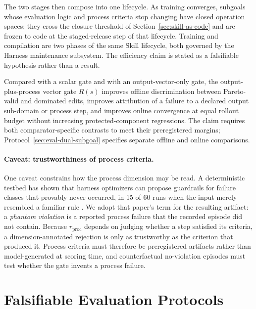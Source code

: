 The two stages then compose into one lifecycle. As training converges, subgoals whose evaluation logic and process criteria stop changing have closed operation spaces; they cross the closure threshold of Section~\ref{sec:skill-as-code} and are frozen to code at the staged-release step of that lifecycle. Training and compilation are two phases of the same Skill lifecycle, both governed by the Harness maintenance subsystem. The efficiency claim is stated as a falsifiable hypothesis rather than a result.

\begin{proposition}
\label{prop:p15}
Compared with a scalar gate and with an output-vector-only gate, the output-plus-process vector gate $R(s)$ improves offline discrimination between Pareto-valid and dominated edits, improves attribution of a failure to a declared output sub-domain or process step, and improves online convergence at equal rollout budget without increasing protected-component regressions. The claim requires both comparator-specific contrasts to meet their preregistered margins; Protocol~\ref{sec:eval-dual-subgoal} specifies separate offline and online comparisons.
\end{proposition}

\paragraph{Caveat: trustworthiness of process criteria.}
One caveat constrains how the process dimension may be read. A deterministic testbed has shown that harness optimizers can propose guardrails for failure classes that provably never occurred, in 15 of 60 runs when the input merely resembled a familiar rule \cite{wang2026phantom}. We adopt that paper's term for the resulting artifact: a \textit{phantom violation} is a reported process failure that the recorded episode did not contain. Because $r_{\mathrm{proc}}$ depends on judging whether a step satisfied its criteria, a dimension-annotated rejection is only as trustworthy as the criterion that produced it. Process criteria must therefore be preregistered artifacts rather than model-generated at scoring time, and counterfactual no-violation episodes must test whether the gate invents a process failure.

\section{Falsifiable Evaluation Protocols}
\label{sec:evaluation}

